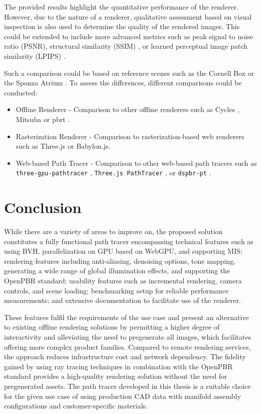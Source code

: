 The provided results highlight the quantitative performance of the renderer. However, due to the nature of a renderer, qualitative assessment based on visual inspection is also used to determine the quality of the rendered images. This could be extended to include more advanced metrics such as peak signal to noise ratio (PSNR), structural similarity (SSIM) \cite{ssim}, or learned perceptual image patch similarity (LPIPS) \cite{lpips}.

Such a comparison could be based on reference scenes such as the Cornell Box \cite{goral1984modeling} or the Sponza Atrium \cite{dabrovic2002sponza}. To assess the differences, different comparisons could be conducted:

\begin{itemize}
    \item{Offline Renderer} - Comparison to other offline renderers such as Cycles \cite{cycles}, Mitsuba \cite{Jakob2020DrJit} or \gls{pbrt} \cite{Pharr_Physically_Based_Rendering_2023}.
    \item{Rasterization Renderer} - Comparison to rasterization-based web renderers such as \gls{Three.js} or \gls{Babylon.js}.
    \item{Web-based Path Tracer} - Comparison to other web-based path tracers such as \texttt{three-gpu-pathtracer} \cite{ThreeJsPathTracerJohnson}, \texttt{Three.js PathTracer} \cite{ThreeJsPathTracerLoftis}, or \texttt{dspbr-pt} \cite{PathTracerDassault}.
\end{itemize}

\section{Conclusion}

While there are a variety of areas to improve on, the proposed solution constitutes a fully functional path tracer encompassing technical features such as using \gls{BVH}, parallelization on \gls{GPU} based on \gls{WebGPU}, and supporting \gls{MIS}; rendering features including anti-aliasing, denoising options, tone mapping, generating a wide range of global illumination effects, and supporting the \gls{OpenPBR} standard; usability features such as incremental rendering, camera controls, and scene loading; benchmarking setup for reliable performance measurements; and extensive documentation to facilitate use of the renderer.

These features fulfil the requirements of the use case and present an alternative to existing offline rendering solutions by permitting a higher degree of interactivity and alleviating the need to pregenerate all images, which facilitates offering more complex product families. Compared to remote rendering services, the approach reduces infrastructure cost and network dependency. The fidelity gained by using ray tracing techniques in combination with the \gls{OpenPBR} standard provides a high-quality rendering solution without the need for pregenerated assets. The path tracer developed in this thesis is a suitable choice for the given use case of using production \gls{CAD} data with manifold assembly configurations and customer-specific materials.

